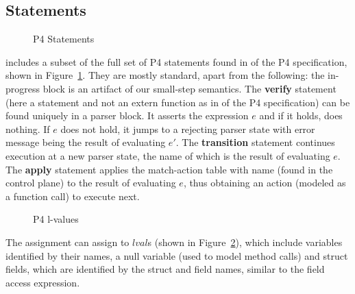 \documentclass[UTF8]{article}
\begin{document}
\newpage
\subsection{Statements} \label{ssec:stmt}

\begin{figure}[h!]
\centering\ottgrammartabular{
\ottstmt\ottafterlastrule
}
\caption{P4 Statements}
\label{fig:stmt}
\end{figure}

\pfott{} includes a subset of the full set of P4 statements found in  of the P4 specification, shown in Figure~\ref{fig:stmt}. They are mostly standard, apart from the following: the in-progress block is an artifact of our small-step semantics. The \textbf{verify} statement (here a statement and not an extern function as in  of the P4 specification) can be found uniquely in a parser block. It asserts the expression $e$ and if it holds, does nothing. If $e$ does not hold, it jumps to a rejecting parser state with error message being the result of evaluating $e'$. The \textbf{transition} statement continues execution at a new parser state, the name of which is the result of evaluating $e$. The \textbf{apply} statement applies the match-action table with name \tn{} (found in the control plane) to the result of evaluating $e$, thus obtaining an action (modeled as a function call) to execute next.

\begin{figure}[h!]
\centering\ottgrammartabular{
\ottlval\ottafterlastrule
}
\caption{P4 l-values}
\label{fig:lval}
\end{figure}

The assignment can assign to $lval$s (shown in Figure~\ref{fig:lval}), which include variables identified by their names, a null variable (used to model method calls) and struct fields, which are identified by the struct and field names, similar to the field access expression.

\newpage
\newcommand{\exstate}{\ensuremath{s}}
\newcommand{\currsf}{\ensuremath{\varepsilon}}
\newcommand{\gscope}{\ensuremath{{\gamma}_G}}
\newcommand{\gscopel}{\ensuremath{\bar{\gamma}_G}}
\newcommand{\escope}{\ensuremath{{\gamma}_{\emptyset}}}
\newcommand{\cstack}{E}
\newcommand{\status}{\ensuremath{t}}
\newcommand{\running}{\textbf{run}}
\newcommand{\returnst}[1]{\ensuremath{\textbf{ret}\,\,#1}}
\newcommand{\accept}{\textbf{acc}}
\newcommand{\reject}[1]{\textbf{rej} #1}
\newcommand{\trans}[1]{\textbf{tra} #1}
\newcommand{\sterr}{\ensuremath{\bot}}
\newcommand{\pfin}{\ensuremath{p_{\mathrm{fin}}}}
\newcommand{\expr}{\ensuremath{e}}
\newcommand{\varstar}{\mathbf{var \, star}}
\newcommand{\scope}{\gamma}
\newcommand{\scopeL}{\overrightarrow{\gamma}}
\newcommand{\cons}{, ... \, ,}
\newcommand{\concat}{{+}\mspace{-8mu}{+}}
\newcommand{\funn}{\ensuremath{funn}}
\newcommand{\bitv}{\ensuremath{bitv}}
\newcommand{\estmt}{\emptyset_{ \mathrm{stmt} }}
\newcommand{\frameL}{\overrightarrow{\Phi}}
\newcommand{\declL}{\overrightarrow{decl}}
\end{document}
